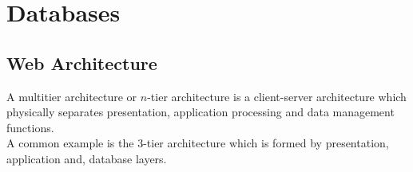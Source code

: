 \section{Databases}

\subsection{Web Architecture}

A multitier architecture or $n$-tier architecture is a client-server
architecture which physically separates presentation,
application processing and data management functions.
\\[\baselineskip]
A common example is the 3-tier architecture which is formed
by presentation, application and, database layers.
